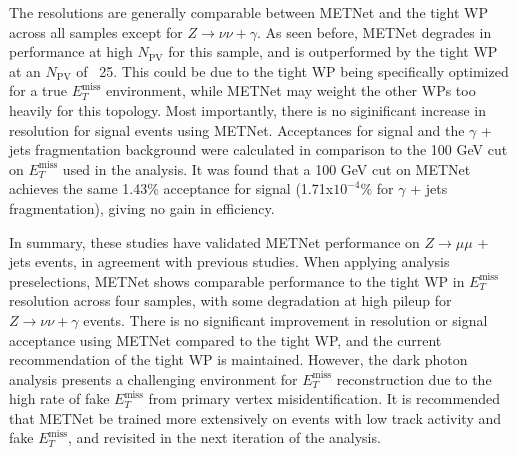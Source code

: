 The resolutions are generally comparable between METNet and the tight WP across all samples except for $Z\rightarrow\nu\nu+\gamma$.
As seen before, METNet degrades in performance at high $N_{\text{PV}}$ for this sample, and is outperformed by the tight WP at an $N_{\text{PV}}$ of ~25.
This could be due to the tight WP being specifically optimized for a true \(E_T^{\text{miss}} \) environment, while METNet may weight the other WPs too heavily for this topology.
Most importantly, there is no siginificant increase in resolution for signal events using METNet.
Acceptances for signal and the $\gamma$ + jets fragmentation background were calculated in comparison to the 100 GeV cut on \(E_T^{\text{miss}} \) used in the analysis.
It was found that a 100 GeV cut on METNet achieves the same 1.43\% acceptance for signal (1.71x$10^{-4}$\% for $\gamma$ + jets fragmentation), giving no gain in efficiency.

In summary, these studies have validated METNet performance on $Z\rightarrow\mu\mu$ + jets events, in agreement with previous studies.
When applying analysis preselections, METNet shows comparable performance to the tight WP in \(E_T^{\text{miss}} \) resolution across four samples, with some degradation at high pileup for $Z\rightarrow\nu\nu+\gamma$ events.
There is no significant improvement in resolution or signal acceptance using METNet compared to the tight WP, and the current recommendation of the tight WP is maintained.
However, the dark photon analysis presents a challenging environment for \(E_T^{\text{miss}} \) reconstruction due to the high rate of fake \(E_T^{\text{miss}} \) from primary vertex misidentification.
It is recommended that METNet be trained more extensively on events with low track activity and fake \(E_T^{\text{miss}} \), and revisited in the next iteration of the analysis.